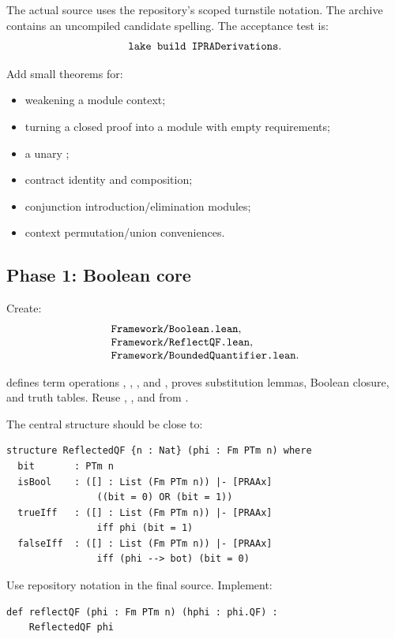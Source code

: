 The actual source uses the repository's scoped turnstile notation.  The archive
contains an uncompiled candidate spelling.  The acceptance test is:
\[
    \code{lake build IPRADerivations}.
\]

Add small theorems for:
\begin{itemize}
\item weakening a module context;
\item turning a closed proof into a module with empty requirements;
\item a unary ;
\item contract identity and composition;
\item conjunction introduction/elimination modules;
\item context permutation/union conveniences.
\end{itemize}

\subsection{Phase 1: Boolean core}

Create:
\[
\begin{array}{l}
\code{Framework/Boolean.lean},\\
\code{Framework/ReflectQF.lean},\\
\code{Framework/BoundedQuantifier.lean}.
\end{array}
\]

 defines term operations , ,
, and , proves substitution lemmas, Boolean closure, and
truth tables.  Reuse , , and  from
.

The central structure should be close to:

\begin{lstlisting}[language={}]
structure ReflectedQF {n : Nat} (phi : Fm PTm n) where
  bit       : PTm n
  isBool    : ([] : List (Fm PTm n)) |- [PRAAx]
                ((bit = 0) OR (bit = 1))
  trueIff   : ([] : List (Fm PTm n)) |- [PRAAx]
                iff phi (bit = 1)
  falseIff  : ([] : List (Fm PTm n)) |- [PRAAx]
                iff (phi --> bot) (bit = 0)
\end{lstlisting}

Use repository notation in the final source.  Implement:

\begin{lstlisting}[language={}]
def reflectQF (phi : Fm PTm n) (hphi : phi.QF) :
    ReflectedQF phi
\end{lstlisting}

